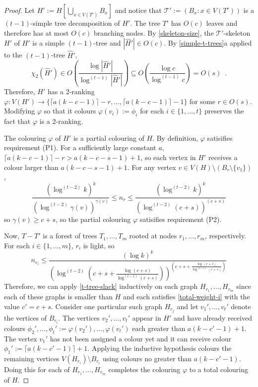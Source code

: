 \documentclass[kpfonts]{patmorin}
\newcommand{\trn}{\chi_2}
\theoremstyle{named}
\newcommand{\weirdref}[2]{\cref{#1}#2}
\begin{document}
\begin{proof}
    Let $H':=H[\bigcup_{x\in V(T')} B_x]$ and notice that $\mathcal{T}':=(B_x:x\in V(T'))$ is a $(t-1)$-simple tree decomposition of $H'$. The tree $T'$ has $O(c)$ leaves and therefore has at most $O(c)$ branching nodes. By \cref{skeleton-size}, the $\mathcal{T}'$-skeleton $\hat{H'}$ of $H'$ is a simple $(t-1)$-tree and $|\hat{H}'|\in O(c)$.  By \weirdref{simple-t-trees}{a} applied to the $(t-1)$-tree $\hat{H}'$,
    \[
       \trn(\hat{H}')\in
       O\left(\frac{\log|\hat{H}'|}{\log^{(t-1)}|\hat{H}'|}\right)
       \subseteq O\left(\frac{\log c}{\log^{(t-1)} c}\right) = O(s) \enspace .
    \]
    Therefore, $H'$ has a 2-ranking $\varphi:V(H')\to \{\lceil a(k-c-1)\rceil-r,\ldots,\lceil a(k-c-1)\rceil-1\}$ for some $r\in O(s)$. Modifying $\varphi$ so that it colours $\varphi(v_i):=\phi_i$ for each $i\in\{1,\ldots,t\}$ preserves the fact that $\varphi$ is a 2-ranking.

    The colouring $\varphi$ of $H'$ is a partial colouring of $H$. By definition, $\varphi$ satisifies requirement (P1). For a sufficiently large constant $a$, $\lceil a(k-c-1)\rceil-r >  a(k-c-s-1)+1$, so each vertex in $H'$ receives a colour larger than $a(k-c-s-1)+1$.  For any vertex $v\in V(H)\setminus (B_r\setminus \{v_1\})$,
    \[ \frac{(\log^{(t-2)} k)^k}{(\log^{(t-2)}\gamma(v))^{\gamma(v)}}
         \le n_r
         \le \frac{(\log^{(t-2)} k)^k}{(\log^{(t-2)}(c+s))^{(c+s)}}
    \]
    so $\gamma(v)\ge c+s$, so the partial colouring $\varphi$ satisifies requirement (P2).

   Now, $T-T'$ is a forest of trees $T_1,\ldots,T_m$ rooted at nodes $r_1,\ldots,r_m$, respectively.
   For each $i\in\{1,\ldots,m\}$, $r_i$ is light, so
   \[
       n_{r_i} \le \frac{(\log k)^k}{
        \left(
            \log^{(t-2)}
                \left(
                   c+s+\tfrac{\log(c+s)}{\log^{(t-1)}(c+s)}
               \right)
        \right)^{\left(
           c+s+\tfrac{\log(c+s)}{\log^{(t-1)}(c+s)}
       \right)}
       }
   \]
   Therefore, we can apply \cref{t-tree-slack} inductively on each graph $H_{r_1},\ldots,H_{r_m}$ since each of these graphs is smaller than $H$ and each satisfies \cref{total-weight-i} with the value $c'=c+s$.
   Consider one particular such graph $H_{r_j}$ and let $v_1',\ldots,v_t'$ denote the vertices of $B_{r_i}$.  The vertices $v_2',\ldots,v_t'$ appear in $H'$ and have already received colours $\phi_2',\ldots,\phi_t':=\varphi(v_2'),\ldots,\varphi(v_t')$ each greater than $a(k-c'-1)+1$.  The vertex $v_1'$ has not been assigned a colour yet and it can receive colour $\phi_1':=\lceil a(k-c'-1)\rceil+1$.  Applying the inductive hypothesis colours the remaining vertices $V(H_{r_i})\setminus B_{r_i}$ using colours no greater than $a(k-c'-1)$.  Doing this for each of $H_{r_1},\ldots,H_{r_m}$ completes the colouring $\varphi$ to a total colouring of $H$.


\end{proof}
\end{document}
